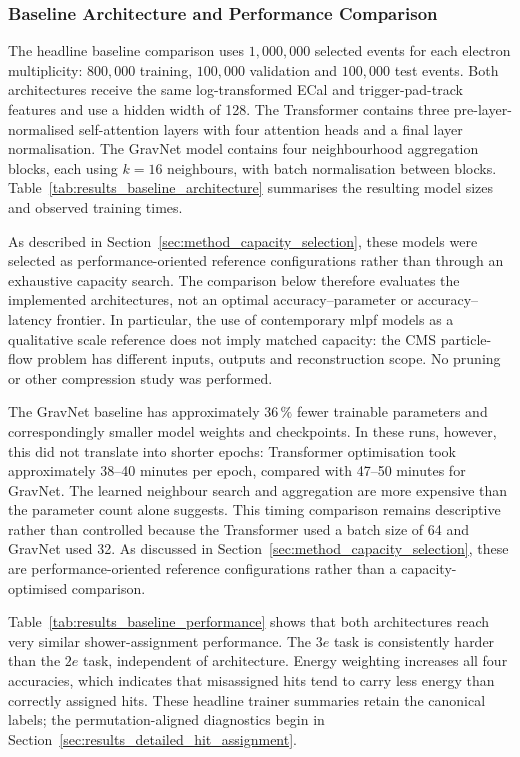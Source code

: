 \subsubsection{Baseline Architecture and Performance Comparison}

The headline baseline comparison uses \(1{,}000{,}000\) selected events for
each electron multiplicity: \(800{,}000\) training, \(100{,}000\) validation
and \(100{,}000\) test events.
Both architectures receive the same log-transformed ECal and trigger-pad-track
features and use a hidden width of 128. The Transformer contains three
pre-layer-normalised self-attention layers with four attention heads and a
final layer normalisation. The GravNet model contains four neighbourhood
aggregation blocks, each using \(k=16\) neighbours, with batch normalisation
between blocks. Table~\ref{tab:results_baseline_architecture} summarises the
resulting model sizes and observed training times.



As described in Section~\ref{sec:method_capacity_selection}, these models were
selected as performance-oriented reference configurations rather than through
an exhaustive capacity search. The comparison below therefore evaluates the
implemented architectures, not an optimal accuracy--parameter or
accuracy--latency frontier. In particular, the use of contemporary \gls{mlpf}
models as a qualitative scale reference does not imply matched capacity: the
CMS particle-flow problem has different inputs, outputs and reconstruction
scope. No pruning or other compression study was performed.

The GravNet baseline has approximately \(36\,\%\) fewer trainable parameters
and correspondingly smaller model weights and checkpoints. In these runs,
however, this did not translate into shorter epochs: Transformer optimisation
took approximately 38--40 minutes per epoch, compared with 47--50 minutes for
GravNet. The learned neighbour search and aggregation are more expensive than
the parameter count alone suggests. This timing comparison remains
descriptive rather than controlled because the Transformer used a batch size
of 64 and GravNet used 32. As discussed in
Section~\ref{sec:method_capacity_selection}, these are performance-oriented
reference configurations rather than a capacity-optimised comparison.

Table~\ref{tab:results_baseline_performance} shows that both architectures
reach very similar shower-assignment performance. The \(3e\) task is
consistently harder than the \(2e\) task, independent of architecture. Energy
weighting increases all four accuracies, which indicates that misassigned
hits tend to carry less energy than correctly assigned hits. These headline
trainer summaries retain the canonical labels; the permutation-aligned
diagnostics begin in Section~\ref{sec:results_detailed_hit_assignment}.

